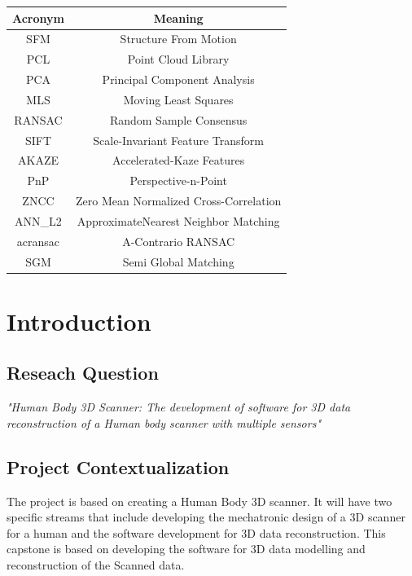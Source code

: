 \documentclass[12pt]{report}
\begin{document}
\begin{table}[H]
  \centering
  \begin{tabular}{|c|c|}
  \hline
  \textbf{Acronym} & \textbf{Meaning}                  \\ \hline
  SFM              & Structure From Motion             \\ \hline
  PCL              & Point Cloud Library               \\ \hline
  PCA              & Principal Component Analysis      \\ \hline
  MLS              & Moving Least Squares              \\ \hline
  RANSAC           & Random Sample Consensus           \\ \hline
  SIFT             & Scale-Invariant Feature Transform \\ \hline
  AKAZE            & Accelerated-Kaze Features         \\ \hline
  PnP              & Perspective-n-Point               \\ \hline
  ZNCC             & Zero Mean Normalized Cross-Correlation \\ \hline
  ANN\_L2          & ApproximateNearest Neighbor Matching \\ \hline
  acransac         & A-Contrario RANSAC          \\ \hline  
  SGM              &Semi Global Matching \\ \hline  
  \end{tabular}
  \end{table}



\newpage
\setcounter{page}{1}

\chapter{Introduction}

\section{Reseach Question}
\textit{\large{"Human Body 3D Scanner: The development of software for 3D data reconstruction of a Human body scanner with multiple sensors" }}

\section{Project Contextualization}
The project is based on creating a Human Body 3D scanner.
It will have two specific streams that include developing the mechatronic design of a 3D scanner for a human and the software development for 3D data reconstruction. 
This capstone is based on developing the software for 3D data modelling and reconstruction of the Scanned data.
\end{document}
